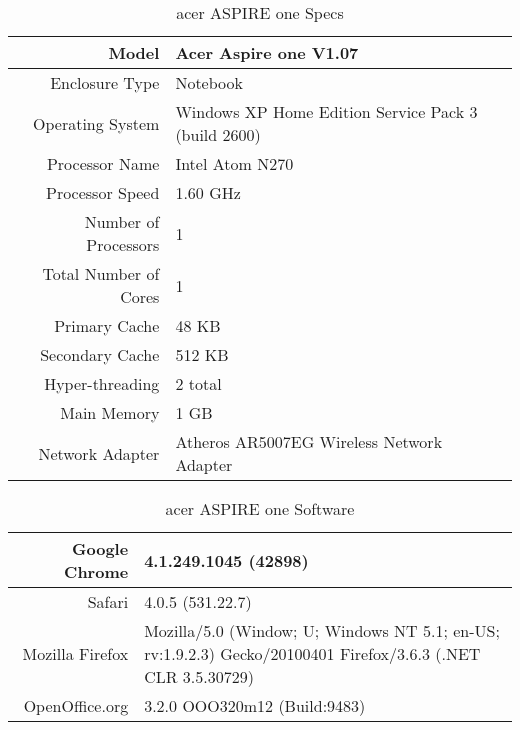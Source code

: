   \begin{table}
    \begin{tabular}{| r | p{5cm} |}
      \hline
      Model                        & Acer Aspire one V1.07 \\ \hline
      Enclosure Type               & Notebook \\ \hline
      Operating System             & Windows XP Home Edition Service Pack 3 (build
                                     2600) \\ \hline
      Processor Name               & Intel Atom N270 \\ \hline
      Processor Speed              & 1.60 GHz \\ \hline
      Number of Processors         & 1 \\ \hline
      Total Number of Cores        & 1 \\ \hline
      Primary Cache                & 48 KB \\ \hline
      Secondary Cache              & 512 KB \\ \hline
      Hyper-threading              & 2 total \\ \hline
      Main Memory                  & 1 GB \\ \hline
      Network Adapter              & Atheros AR5007EG Wireless Network Adapter \\
      \hline
    \end{tabular}
    \caption{acer ASPIRE one Specs}
    \label{aspireSpecs}
  \end{table}\begin{table}
    \begin{tabular}{| r | p{5cm} |}
      \hline
      Google Chrome                & 4.1.249.1045 (42898) \\ \hline
      Safari                       & 4.0.5 (531.22.7) \\ \hline
      Mozilla Firefox              & Mozilla/5.0 (Window; U; Windows NT 5.1;
      en-US; rv:1.9.2.3) Gecko/20100401
      Firefox/3.6.3 (.NET CLR 3.5.30729) \\ \hline
      OpenOffice.org               & 3.2.0 OOO320m12 (Build:9483) \\
      \hline
    \end{tabular}
    \caption{acer ASPIRE one Software}
    \label{aspireSoftware}
  \end{table}